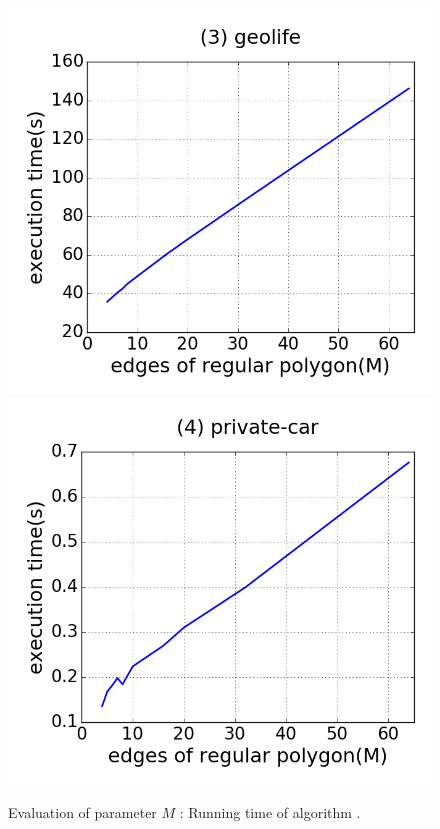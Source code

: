 \begin{figure}[tb!]
\includegraphics[scale = 0.24]{figures/Exp-M-time-geolife.png}
\includegraphics[scale = 0.24]{figures/Exp-M-time-private.png}
\vspace{-2ex}
\caption{\small Evaluation of parameter $M$ : Running time of algorithm \cist.}
\label{fig:m-time-cist}
\vspace{-1ex}
\end{figure}

